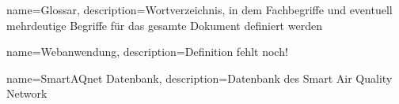 {
	name=Glossar,
	description={Wortverzeichnis, in dem Fachbegriffe und eventuell mehrdeutige Begriffe für das gesamte Dokument definiert werden}
}

{
	name=Webanwendung,
	description={Definition fehlt noch!}
}

{
	name=SmartAQnet Datenbank,
	description={Datenbank des Smart Air Quality Network}
}